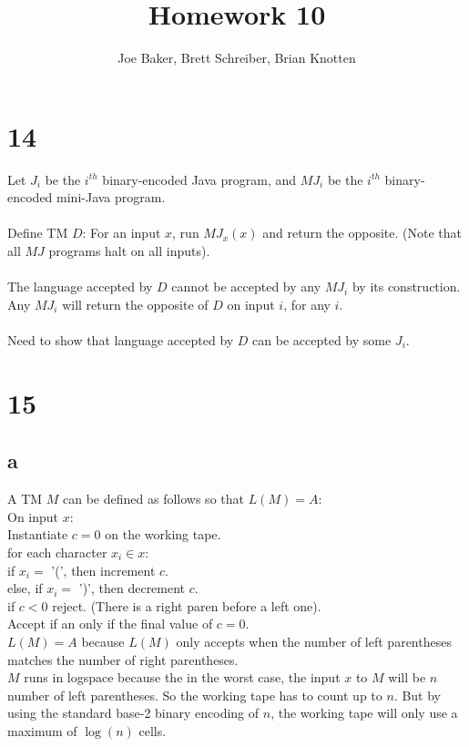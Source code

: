 \documentclass[letterpaper,notitlepage,twoside]{article}
\newcommand\tab[1][1cm]{\hspace*{#1}} %
\begin{document}
\title{Homework 10}
\author{Joe Baker, Brett Schreiber, Brian Knotten}
\maketitle

\section*{14}
Let $J_i$ be the $i^{th}$ binary-encoded Java program, and $MJ_i$ be the $i^{th}$ binary-encoded mini-Java program.
\\\\
Define TM $D$:
For an input $x$, run $MJ_x(x)$ and return the opposite. (Note that all $MJ$ programs halt on all inputs).
\\\\
The language accepted by $D$ cannot be accepted by any $MJ_i$ by its construction. Any $MJ_i$ will return the opposite of $D$ on input $i$, for any $i$.
\\\\
Need to show that language accepted by $D$ can be accepted by some $J_i$.


\section*{15}
\subsection*{a}
A TM $M$ can be defined as follows so that $L(M) = A$: \\
On input $x$: \\
\tab Instantiate $c = 0$ on the working tape. \\
\tab for each character $x_i \in x$: \\
\tab\tab if $x_i =$ '(', then increment $c$. \\
\tab\tab else, if $x_i =$ ')', then decrement $c$. \\
\tab\tab if $c < 0$ reject. (There is a right paren before a left one). \\
\tab Accept if an only if the final value of $c = 0$. \\
$L(M) = A$ because $L(M)$ only accepts when the number of left parentheses matches the number of right parentheses. \\
$M$ runs in logspace because the in the worst case, the input $x$ to $M$ will be $n$ number of left parentheses. So the working tape has to count up to $n$. But by using the standard base-2 binary encoding of $n$, the working tape will only use a maximum of $\log(n)$ cells. \\
\end{document}
